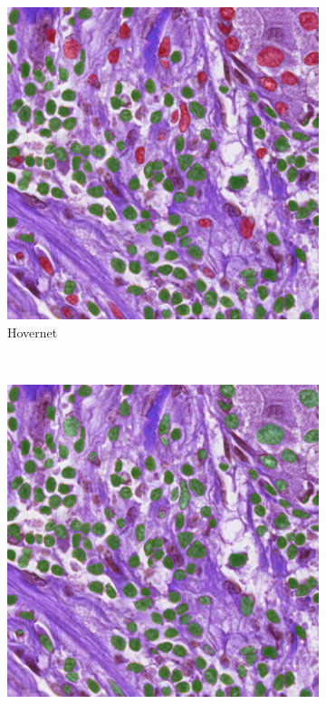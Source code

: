 \begin{figure}[H]
\begin{subfigure}[b]{0.45\textwidth}
    \includegraphics[width=\textwidth]{imgs/qual/monusac/hov1.png}
    \caption{Hovernet}
    \label{fig:monusac-hov1}
  \end{subfigure}
  \\
  \begin{subfigure}[b]{0.45\textwidth}
    \includegraphics[width=\textwidth]{imgs/qual/monusac/gcn-full1.png}

\end{subfigure}
\end{figure}
